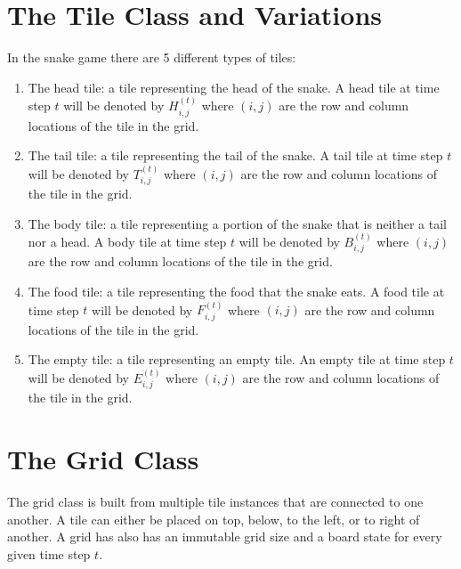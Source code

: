 \documentclass{article}
\begin{document}
\section{The Tile Class and Variations}
In the snake game there are 5 different types of tiles:
\begin{enumerate}
    \item The head tile: a tile representing the head of the snake. A head tile at time step $t$ will be denoted by $H_{i,j}^{(t)}$ where $(i, j)$ are the row and column locations of the tile in the grid. 
    \item The tail tile: a tile representing the tail of the snake. A tail tile at time step $t$ will be denoted by $T_{i,j}^{(t)}$ where $(i, j)$ are the row and column locations of the tile in the grid.
    \item The body tile: a tile representing a portion of the snake that is neither a tail nor a head. A body tile at time step $t$ will be denoted by $B_{i,j}^{(t)}$ where $(i, j)$ are the row and column locations of the tile in the grid. 
    \item The food tile: a tile representing the food that the snake eats. A food tile at time step $t$ will be denoted by $F_{i,j}^{(t)}$ where $(i, j)$ are the row and column locations of the tile in the grid.
    \item The empty tile: a tile representing an empty tile. An empty tile at time step $t$ will be denoted by $E_{i,j}^{(t)}$ where $(i, j)$ are the row and column locations of the tile in the grid.
\end{enumerate}
\section{The Grid Class}
The grid class is built from multiple tile instances that are connected to one another. A tile can either be placed on top, below, to the left, or to right of another. A grid has also has an immutable grid size and a board state for every given time step $t$.
\end{document}
